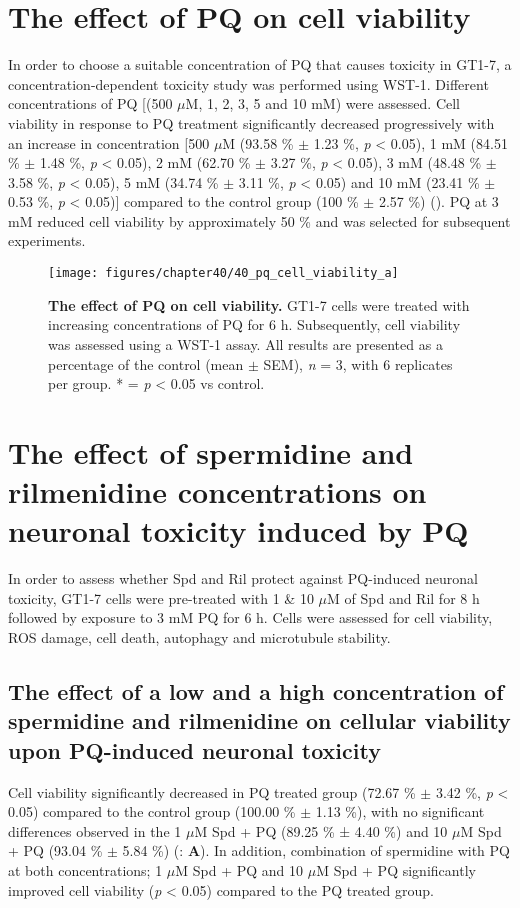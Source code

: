 \section{The effect of PQ on cell viability}
In order to choose a suitable concentration of PQ that causes toxicity in GT1-7, a concentration-dependent toxicity study was performed using WST-1. Different concentrations of PQ [(500 $\mu$M, 1, 2, 3, 5 and 10 mM) were assessed. Cell viability in response to PQ treatment significantly decreased progressively with an increase in concentration [500 $\mu$M (93.58 \% $\pm$ 1.23 \%, \textit{p} < 0.05), 1 mM (84.51 \% $\pm$ 1.48 \%, \textit{p} < 0.05), 2 mM (62.70 \% $\pm$ 3.27 \%, \textit{p} < 0.05), 3 mM (48.48 \% $\pm$ 3.58 \%, \textit{p} < 0.05), 5 mM (34.74 \% $\pm$ 3.11 \%, \textit{p} < 0.05) and 10 mM (23.41 \% $\pm$ 0.53 \%, \textit{p} < 0.05)] compared to the control group (100 \% $\pm$ 2.57 \%) (). PQ at 3 mM reduced cell viability by approximately 50 \% and was selected for subsequent experiments.

\begin{figure}[!htbp]
\center
  \texttt{[image: figures/chapter40/40\_pq\_cell\_viability\_a]}
  \caption[The effect of PQ on cell viability]{\textbf{The effect of PQ on cell viability.} GT1-7 cells were treated with increasing concentrations of PQ for 6 h. Subsequently, cell viability was assessed using a WST-1 assay. All results are presented as a percentage of the control (mean $\pm$ SEM), \textit{n} = 3, with 6 replicates per group. * = \textit{p} < 0.05 vs control.}
  \label{fig:40_pq_cell_viability_a}
\end{figure} 

\section{The effect of spermidine and rilmenidine concentrations on neuronal toxicity induced by PQ}
In order to assess whether Spd and Ril protect against PQ-induced neuronal toxicity, GT1-7 cells were pre-treated with 1 \& 10 $\mu$M of Spd and Ril for 8 h followed by exposure to 3 mM PQ for 6 h. Cells were assessed for cell viability, ROS damage, cell death, autophagy and microtubule stability.

\subsection{The effect of a low and a high concentration of spermidine and rilmenidine on cellular viability upon PQ-induced neuronal toxicity} 
Cell viability significantly decreased in PQ treated group (72.67 \% $\pm$ 3.42 \%, \textit{p} < 0.05) compared to the control group (100.00 \% $\pm$ 1.13 \%), with no significant differences observed in the 1 $\mu$M Spd + PQ (89.25 \% ± 4.40 \%) and 10 $\mu$M Spd + PQ (93.04 \% $\pm$ 5.84 \%) (: \textbf{A}). In addition, combination of spermidine with PQ at both concentrations; 1 $\mu$M Spd + PQ and 10 $\mu$M Spd + PQ significantly improved cell viability (\textit{p} < 0.05) compared to the PQ treated group. 

